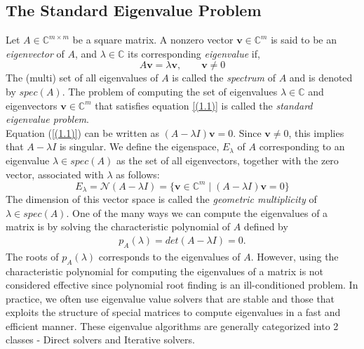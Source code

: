 \subsection{The Standard Eigenvalue Problem}
Let $A \in \mathbb{C}^{m\times m}$ be a square matrix. A nonzero vector $\mathbf{v} \in \mathbb{C}^m$ is said to be an \textit{eigenvector} of $A$, and $\lambda \in \mathbb{C}$ its corresponding \textit{eigenvalue} if,
\begin{equation}\label{(1.1)}
	A\mathbf{v} = \lambda \mathbf{v}, \qquad \mathbf{v} \neq 0
\end{equation}
The (multi) set of all eigenvalues of $A$ is called the \textit{spectrum} of $A$ and is denoted by $spec(A)$.
The problem of computing the set of eigenvalues $\lambda \in \mathbb{C}$ and eigenvectors $\mathbf{v} \in \mathbb{C}^{m}$ that satisfies equation \ref{(1.1)} is called the \textit{standard eigenvalue problem}. \\
Equation (\ref{(1.1)}) can be written as $(A-\lambda I)\mathbf{v} = 0$. Since $\mathbf{v}\neq0$, this implies that $A-\lambda I$ is singular. We define the eigenspace, $E_\lambda$ of $A$ corresponding to an eigenvalue $\lambda \in spec(A)$ as the set of all eigenvectors, together with the zero vector, associated with $\lambda$ as follows:
\begin{equation}
	E_\lambda = \mathcal{N}(A-\lambda I) = \{\mathbf{v} \in \mathbb{C}^{m} \mid (A - \lambda I)\mathbf{v} = 0\}
\end{equation}
The dimension of this vector space is called the \textit{geometric multiplicity} of $\lambda \in spec(A)$.
One of the many ways we can compute the eigenvalues of a matrix is by solving the characteristic polynomial of $A$ defined by
\begin{align*}
	p_A (\lambda) = det(A - \lambda I)  = 0.
\end{align*}
The roots of $p_A (\lambda)$ corresponds to the eigenvalues of $A$. However, using the characteristic polynomial for computing the eigenvalues of a matrix is not considered effective since polynomial root finding is an ill-conditioned problem. In practice, we often use eigenvalue value solvers that are stable and those that exploits the structure of special matrices to compute eigenvalues in a fast and efficient manner. These eigenvalue algorithms are generally categorized into 2 classes - Direct solvers and Iterative solvers.
